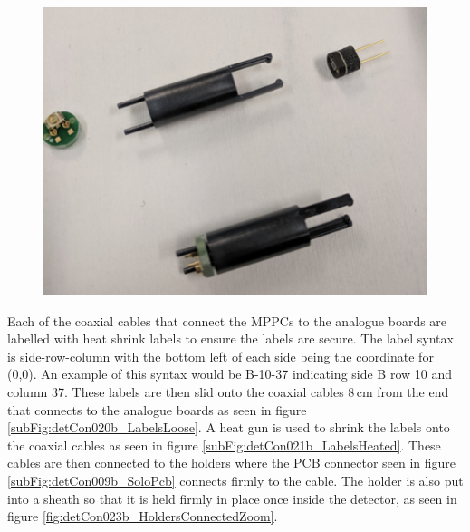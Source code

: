 \begin{figure}[!h]
\centering
\includegraphics[width=0.7\linewidth]{Chapter3/Figs/Raster/detCon017b_HoldersWithParts.png}
\label{fig:detCon017b_HoldersWithParts}
\end{figure}

Each of the coaxial cables that connect the MPPCs to the analogue boards are labelled with heat shrink labels to ensure the labels are secure. The label syntax is side-row-column with the bottom left of each side being the coordinate for (0,0). An example of this syntax would be B-10-37 indicating side B row 10 and column 37. These labels are then slid onto the coaxial cables 8\,cm from the end that connects to the analogue boards as seen in figure \ref{subFig:detCon020b_LabelsLoose}. A heat gun is used to shrink the labels onto the coaxial cables as seen in figure \ref{subFig:detCon021b_LabelsHeated}. These cables are then connected to the holders where the PCB connector seen in figure \ref{subFig:detCon009b_SoloPcb} connects firmly to the cable. The holder is also put into a sheath so that it is held firmly in place once inside the detector, as seen in figure \ref{fig:detCon023b_HoldersConnectedZoom}.


